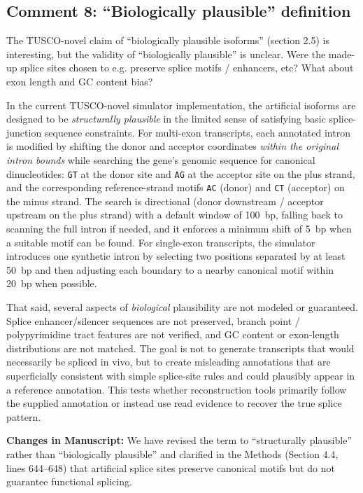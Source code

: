 \documentclass[11pt]{article}
\newcommand{\tuscoNovel}{TUSCO-novel}
\begin{document}
\subsection{Comment 8: ``Biologically plausible'' definition}

\begin{reviewercomment}
The TUSCO-novel claim of ``biologically plausible isoforms'' (section 2.5) is interesting, but the validity of ``biologically plausible'' is unclear. Were the made-up splice sites chosen to e.g. preserve splice motifs / enhancers, etc? What about exon length and GC content bias?
\end{reviewercomment}

\begin{responseboxnew}
In the current \tuscoNovel{} simulator implementation, the artificial isoforms are designed to be \emph{structurally plausible} in the limited sense of satisfying basic splice-junction sequence constraints. For multi-exon transcripts, each annotated intron is modified by shifting the donor and acceptor coordinates \emph{within the original intron bounds} while searching the gene's genomic sequence for canonical dinucleotides: \texttt{GT} at the donor site and \texttt{AG} at the acceptor site on the plus strand, and the corresponding reference-strand motifs \texttt{AC} (donor) and \texttt{CT} (acceptor) on the minus strand. The search is directional (donor downstream / acceptor upstream on the plus strand) with a default window of 100~bp, falling back to scanning the full intron if needed, and it enforces a minimum shift of 5~bp when a suitable motif can be found. For single-exon transcripts, the simulator introduces one synthetic intron by selecting two positions separated by at least 50~bp and then adjusting each boundary to a nearby canonical motif within 20~bp when possible.

That said, several aspects of \emph{biological} plausibility are not modeled or guaranteed. Splice enhancer/silencer sequences are not preserved, branch point / polypyrimidine tract features are not verified, and GC content or exon-length distributions are not matched. The goal is not to generate transcripts that would necessarily be spliced in vivo, but to create misleading annotations that are superficially consistent with simple splice-site rules and could plausibly appear in a reference annotation. This tests whether reconstruction tools primarily follow the supplied annotation or instead use read evidence to recover the true splice pattern.

\vspace{0.3cm}
\textbf{Changes in Manuscript:} We have revised the term to ``structurally plausible'' rather than ``biologically plausible'' and clarified in the Methods (Section 4.4, lines 644--648) that artificial splice sites preserve canonical motifs but do not guarantee functional splicing.
\end{responseboxnew}
\end{document}
